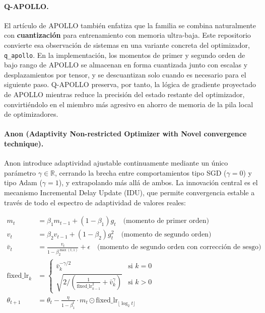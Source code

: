 \documentclass[11pt,a4paper]{article}
\begin{document}
\paragraph{Q-APOLLO.}
El artículo de APOLLO también enfatiza que la familia se combina naturalmente con \textbf{cuantización} para entrenamiento con memoria ultra-baja. Este repositorio convierte esa observación de sistemas en una variante concreta del optimizador, \texttt{q\_apollo}. En la implementación, los momentos de primer y segundo orden de bajo rango de APOLLO se almacenan en forma cuantizada junto con escalas y desplazamientos por tensor, y se descuantizan solo cuando es necesario para el siguiente paso. Q-APOLLO preserva, por tanto, la lógica de gradiente proyectado de APOLLO mientras reduce la precisión del estado restante del optimizador, convirtiéndolo en el miembro más agresivo en ahorro de memoria de la pila local de optimizadores.

\paragraph{Anon (Adaptivity Non-restricted Optimizer with Novel convergence technique).}
Anon \citep{anon2026anon} introduce adaptividad ajustable continuamente mediante un único parámetro $\gamma \in \mathbb{R}$, cerrando la brecha entre comportamientos tipo SGD ($\gamma=0$) y tipo Adam ($\gamma=1$), y extrapolando más allá de ambos. La innovación central es el mecanismo Incremental Delay Update (IDU), que permite convergencia estable a través de todo el espectro de adaptividad de valores reales:

\begin{align}
m_t &= \beta_1 m_{t-1} + (1-\beta_1) g_t \quad\text{(momento de primer orden)}\\
v_t &= \beta_2 v_{t-1} + (1-\beta_2) g_t^2 \quad\text{(momento de segundo orden)}\\
\bar{v}_t &= \frac{v_t}{1-\beta_2^{\max(t,1)}} + \epsilon \quad\text{(momento de segundo orden con corrección de sesgo)}\\
\text{fixed\_lr}_k &= \begin{cases}
\bar{v}_k^{-\gamma/2} & \text{si } k = 0 \\
\sqrt{2 / \left(\frac{1}{\text{fixed\_lr}_{k-1}^2} + \bar{v}_k^\gamma\right)} & \text{si } k > 0
\end{cases}\\
\theta_{t+1} &= \theta_t - \frac{\eta}{1-\beta_1^t} \cdot m_t \odot \text{fixed\_lr}_{\lfloor\log_2 t\rfloor}
\end{align}
\end{document}
